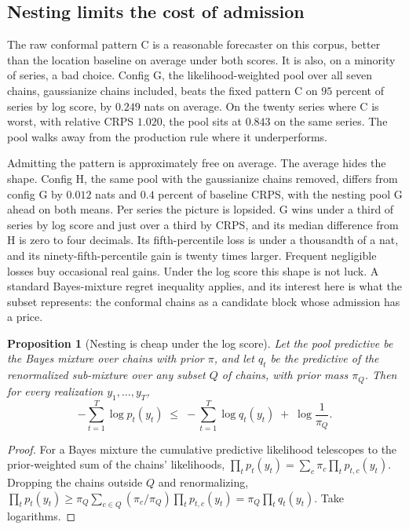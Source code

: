 \documentclass[11pt]{article}
\newtheorem{proposition}{Proposition}
\theoremstyle{remark}
\begin{document}
\subsection{Nesting limits the cost of admission}\label{sec:nesting}

The raw conformal pattern C is a reasonable forecaster on this corpus, better than the
location baseline on average under both scores. It is also, on a minority of series, a bad
choice. Config G, the likelihood-weighted pool over all seven chains, gaussianize chains
included, beats the fixed pattern C on $95$ percent of series by log score, by $0.249$
nats on average. On the twenty series where C is worst, with relative CRPS $1.020$, the
pool sits at $0.843$ on the same series. The pool walks away from the production rule
where it underperforms.

Admitting the pattern is approximately free on average. The average hides the shape. Config H, the same pool with the gaussianize chains removed, differs
from config G by $0.012$ nats and $0.4$ percent of baseline CRPS, with the nesting pool
G ahead on both means. Per series the picture is lopsided. G wins under a third of series by log score and
just over a third by CRPS, and its median difference from H is zero to four decimals.
Its fifth-percentile loss is under a thousandth of a nat, and its ninety-fifth-percentile
gain is twenty times larger. Frequent negligible losses buy occasional real gains. Under
the log score this shape is not luck. A standard Bayes-mixture regret inequality
applies, and its interest here is what the subset represents: the conformal chains as a
candidate block whose admission has a price.

\begin{proposition}[Nesting is cheap under the log score]\label{prop:nesting}
Let the pool predictive be the Bayes mixture over chains with prior $\pi$, and let
$q_t$ be the predictive of the renormalized sub-mixture over any subset $Q$ of chains,
with prior mass $\pi_Q$. Then for every realization $y_1, \dots, y_T$,
\[
  -\sum_{t=1}^T \log p_t(y_t) \;\le\; -\sum_{t=1}^T \log q_t(y_t)
  \;+\; \log\frac{1}{\pi_Q}.
\]
\end{proposition}

\begin{proof}
For a Bayes mixture the cumulative predictive likelihood telescopes to the prior-weighted
sum of the chains' likelihoods,
$\prod_t p_t(y_t) = \sum_c \pi_c \prod_t p_{t,c}(y_t)$. Dropping the chains outside $Q$
and renormalizing,
$\prod_t p_t(y_t) \ge \pi_Q \sum_{c \in Q} (\pi_c/\pi_Q) \prod_t p_{t,c}(y_t)
= \pi_Q \prod_t q_t(y_t)$. Take logarithms.
\end{proof}
\end{document}
